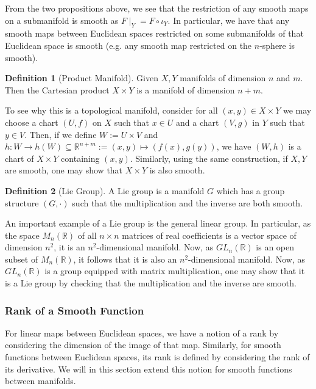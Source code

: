 \documentclass[]{article}
\theoremstyle{definition}
\theoremstyle{definition}
\newtheorem{definition}{Definition}[section]
\begin{document}
From the two propositions above, we see that the restriction of any smooth 
maps on a submanifold is smooth as \(F\mid_Y = F \circ \iota_Y\). In particular, 
we have that any smooth maps between Euclidean spaces restricted on some 
submanifolds of that Euclidean space is smooth (e.g. any smooth map restricted 
on the \(n\)-sphere is smooth).

\begin{definition}[Product Manifold]
  Given \(X, Y\) manifolds of dimension \(n\) and \(m\). Then the Cartesian 
  product \(X \times Y\) is a manifold of dimension \(n + m\).
\end{definition}

To see why this is a topological manifold, consider for all 
\((x, y) \in X \times Y\) we may choose a chart \((U, f)\) on \(X\) such that \(x \in U\) and a chart 
\((V, g)\) in \(Y\) such that \(y \in V\). Then, if we define 
\(W := U \times V\) and \(h : W \to h(W) \subseteq \mathbb{R}^{n + m} := 
(x, y) \mapsto (f(x), g(y))\), we have \((W, h)\) is a chart of \(X \times Y\) 
containing \((x, y)\). Similarly, using the same construction, if \(X, Y\) are 
smooth, one may show that \(X \times Y\) is also smooth.

\begin{definition}[Lie Group]
  A Lie group is a manifold \(G\) which has a group structure \((G, \cdot)\) 
  such that the multiplication and the inverse are both smooth.
\end{definition}

An important example of a Lie group is the general linear group. In particular, 
as the space \(M_n(\mathbb{R})\) of all \(n \times n\) matrices of real 
coefficients is a vector space of dimension \(n^2\), it is an \(n^2\)-dimensional 
manifold. Now, as \(GL_n(\mathbb{R})\) is an open subset of \(M_n(\mathbb{R})\), 
it follows that it is also an \(n^2\)-dimensional manifold. Now, as 
\(GL_n(\mathbb{R})\) is a group equipped with matrix multiplication, one may 
show that it is a Lie group by checking that the multiplication and the inverse 
are smooth.

\subsubsection{Rank of a Smooth Function}

For linear maps between Euclidean spaces, we have a notion of a rank by considering 
the dimension of the image of that map. Similarly, for smooth functions between 
Euclidean spaces, its rank is defined by considering the rank of its derivative.
We will in this section extend this notion for smooth functions between manifolds.
\end{document}

